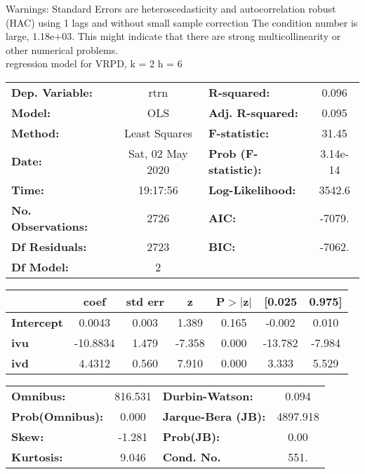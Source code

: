 Warnings: \newline
 [1] Standard Errors are heteroscedasticity and autocorrelation robust (HAC) using 1 lags and without small sample correction \newline
 [2] The condition number is large, 1.18e+03. This might indicate that there are \newline
 strong multicollinearity or other numerical problems.\\ 

regression model for VRPD, k = 2 h = 6\begin{center}
\begin{tabular}{lclc}
\toprule
\textbf{Dep. Variable:}    &       rtrn       & \textbf{  R-squared:         } &     0.096   \\
\textbf{Model:}            &       OLS        & \textbf{  Adj. R-squared:    } &     0.095   \\
\textbf{Method:}           &  Least Squares   & \textbf{  F-statistic:       } &     31.45   \\
\textbf{Date:}             & Sat, 02 May 2020 & \textbf{  Prob (F-statistic):} &  3.14e-14   \\
\textbf{Time:}             &     19:17:56     & \textbf{  Log-Likelihood:    } &    3542.6   \\
\textbf{No. Observations:} &        2726      & \textbf{  AIC:               } &    -7079.   \\
\textbf{Df Residuals:}     &        2723      & \textbf{  BIC:               } &    -7062.   \\
\textbf{Df Model:}         &           2      & \textbf{                     } &             \\
\bottomrule
\end{tabular}
\begin{tabular}{lcccccc}
                   & \textbf{coef} & \textbf{std err} & \textbf{z} & \textbf{P$> |$z$|$} & \textbf{[0.025} & \textbf{0.975]}  \\
\midrule
\textbf{Intercept} &       0.0043  &        0.003     &     1.389  &         0.165        &       -0.002    &        0.010     \\
\textbf{ivu}       &     -10.8834  &        1.479     &    -7.358  &         0.000        &      -13.782    &       -7.984     \\
\textbf{ivd}       &       4.4312  &        0.560     &     7.910  &         0.000        &        3.333    &        5.529     \\
\bottomrule
\end{tabular}
\begin{tabular}{lclc}
\textbf{Omnibus:}       & 816.531 & \textbf{  Durbin-Watson:     } &    0.094  \\
\textbf{Prob(Omnibus):} &   0.000 & \textbf{  Jarque-Bera (JB):  } & 4897.918  \\
\textbf{Skew:}          &  -1.281 & \textbf{  Prob(JB):          } &     0.00  \\
\textbf{Kurtosis:}      &   9.046 & \textbf{  Cond. No.          } &     551.  \\
\bottomrule
\end{tabular}
\end{center}

